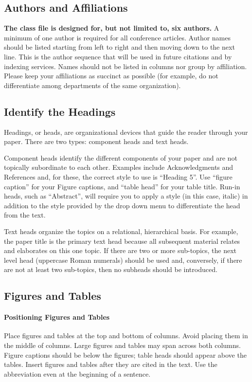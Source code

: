 \documentclass[conference]{IEEEtran}
\begin{document}
\subsection{Authors and Affiliations}
\textbf{The class file is designed for, but not limited to, six authors.} A 
minimum of one author is required for all conference articles. Author names 
should be listed starting from left to right and then moving down to the 
next line. This is the author sequence that will be used in future citations 
and by indexing services. Names should not be listed in columns nor group by 
affiliation. Please keep your affiliations as succinct as possible (for 
example, do not differentiate among departments of the same organization).

\subsection{Identify the Headings}
Headings, or heads, are organizational devices that guide the reader through 
your paper. There are two types: component heads and text heads.

Component heads identify the different components of your paper and are not 
topically subordinate to each other. Examples include Acknowledgments and 
References and, for these, the correct style to use is ``Heading 5''. Use 
``figure caption'' for your Figure captions, and ``table head'' for your 
table title. Run-in heads, such as ``Abstract'', will require you to apply a 
style (in this case, italic) in addition to the style provided by the drop 
down menu to differentiate the head from the text.

Text heads organize the topics on a relational, hierarchical basis. For 
example, the paper title is the primary text head because all subsequent 
material relates and elaborates on this one topic. If there are two or more 
sub-topics, the next level head (uppercase Roman numerals) should be used 
and, conversely, if there are not at least two sub-topics, then no subheads 
should be introduced.

\subsection{Figures and Tables}
\paragraph{Positioning Figures and Tables} Place figures and tables at the top and 
bottom of columns. Avoid placing them in the middle of columns. Large 
figures and tables may span across both columns. Figure captions should be 
below the figures; table heads should appear above the tables. Insert 
figures and tables after they are cited in the text. Use the abbreviation 
even at the beginning of a sentence.
\end{document}
